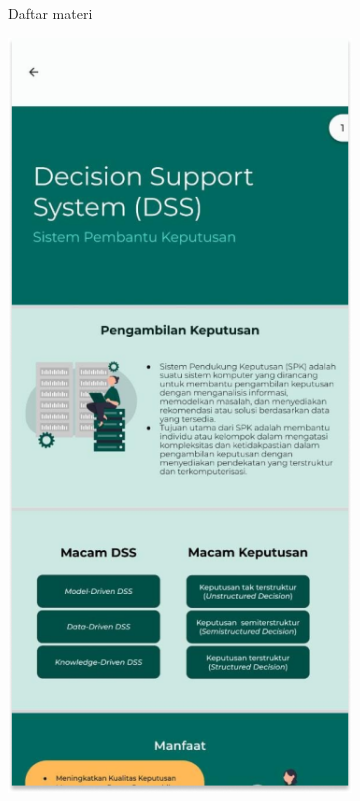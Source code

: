 \begin{figure}[H]
\begin{subfigure}[b]{0.23\textwidth}
	  \caption{Daftar materi}
	  \label{fig:HasilMain2}
	\end{subfigure}
	\begin{subfigure}[b]{0.23\textwidth}
		\centering
	  \includegraphics[width=\linewidth]{contents/chapter-3/images/HF-materi2.png}

\end{subfigure}
\end{figure}

